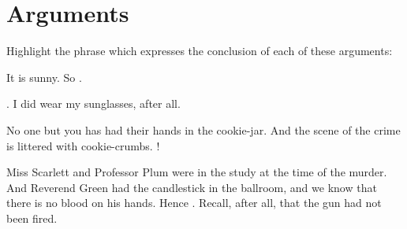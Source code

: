 
\chapter{Arguments}
Highlight the phrase which expresses the conclusion of each of these arguments:
\begin{compactlist}
	\item It is sunny. So .
	\item {}. I did wear my sunglasses, after all.
	\item No one but you has had their hands in the cookie-jar. And the scene of the crime is littered with cookie-crumbs. !
	\item Miss Scarlett and Professor Plum were in the study at the time
	of the murder. And Reverend Green had the candlestick in the
	ballroom, and we know that there is no blood on his hands. Hence
	. Recall, after all, that the gun had not been fired.
\end{compactlist}

